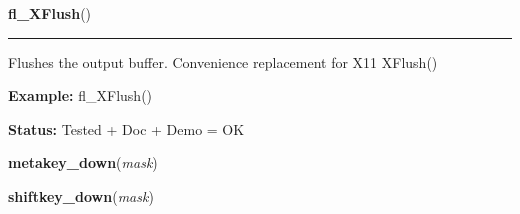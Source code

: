     \vspace{0.5ex}

\hspace{.8\funcindent}\begin{boxedminipage}{\funcwidth}

    \raggedright \textbf{fl\_XFlush}()

    \vspace{-1.5ex}

    \rule{\textwidth}{0.5\fboxrule}
\setlength{\parskip}{2ex}
    Flushes the output buffer. Convenience replacement for X11 XFlush()

\setlength{\parskip}{1ex}
\textbf{Example:} fl\_XFlush()



\textbf{Status:} Tested + Doc + Demo = OK



    \end{boxedminipage}

    \label{xformslib:flxbasic:metakey_down}

    \vspace{0.5ex}

\hspace{.8\funcindent}\begin{boxedminipage}{\funcwidth}

    \raggedright \textbf{metakey\_down}(\textit{mask})

\setlength{\parskip}{2ex}
\setlength{\parskip}{1ex}
    \end{boxedminipage}

    \label{xformslib:flxbasic:shiftkey_down}

    \vspace{0.5ex}

\hspace{.8\funcindent}\begin{boxedminipage}{\funcwidth}

    \raggedright \textbf{shiftkey\_down}(\textit{mask})

\setlength{\parskip}{2ex}
\setlength{\parskip}{1ex}
    \end{boxedminipage}

    \label{xformslib:flxbasic:controlkey_down}

